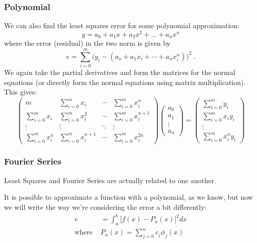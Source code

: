 \documentclass[12pt]{article}
\begin{document}
\subsubsection*{Polynomial}
We can also find the least squares error for some polynomial approximation:
%
\[y = a_0 + a_1 x + a_2 x^2 + \dots +a_n x^n\]
%
where the error (residual) in the two norm is given by
%
\[e = \sum_{i=0}^m \bigl(y_i - (a_o + a_1 x_i+ \cdots + a_n x_i^n)\bigr)^2 \:.\]
%
We again take the partial derivatives and form the matrices for the normal equations (or directly form the normal equations using matrix multiplication). This gives:
%
\begin{equation}
\begin{pmatrix}
m                & \sum_{i=0}^m x_i & \cdots & \sum_{i=0}^m x_i^n \\
\sum_{i=0}^m x_i & \sum_{i=0}^m x_i^2 & \cdots & \sum_{i=0}^m x_i^{n+1} \\ 
\vdots & \vdots & \ddots & \vdots \\
\sum_{i=0}^m x_i^n & \sum_{i=0}^m x_i^{n+1} & \cdots & \sum_{i=0}^m x_i^{2n}
\end{pmatrix}
\begin{pmatrix}
a_0 \\ a_1 \\ \vdots \\ a_n
\end{pmatrix} =
\begin{pmatrix}
\sum_{i=0}^m y_i \\ \sum_{i=0}^m x_i y_i \\ \vdots \\ \sum_{i=0}^m x_i^n y_i \nonumber
\end{pmatrix}
\end{equation}

\subsubsection*{Fourier Series}
Least Squares and Fourier Series are actually related to one another. 

It is possible to approximate a function with a polynomial, as we know, but now we will write the way we're considering the error a bit differently:
%
\begin{align}
e &=\int_a^b \bigl[f(x) - P_n(x)\bigr]^2 dx \nonumber\\
\text{where }& P_n(x) = \sum_{j=0}^{n} c_j \phi_j(x) \nonumber
\end{align}
\end{document}
